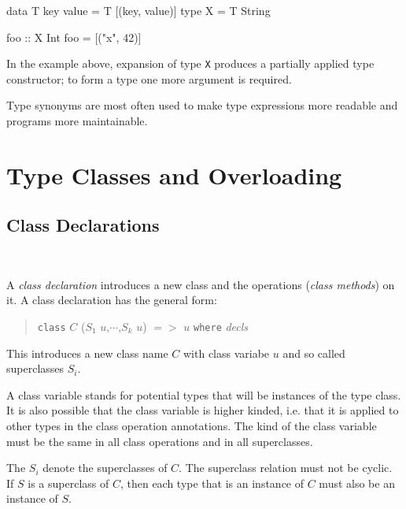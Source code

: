 \begin{code}
data T key value = T [(key, value)]
type X = T String

foo :: X Int
foo = [("x", 42)]
\end{code}

In the example above, expansion of type \texttt{X} produces a partially applied type constructor; to form a type one more argument is required.

Type synonyms are most often used to make type expressions more readable and programs more maintainable.

\section{Type Classes and Overloading}
\subsection{Class Declarations} \label{classdcl}  

\begin{flushleft}
     \\
  
\end{flushleft}

A \emph{class declaration} introduces a new class and the operations (\emph{class methods}) on it. A class declaration has the general form:

\begin{quote}
\texttt{class} $C$ \hspace{0.2cm} ($S_1$ $u$,$\cdots$,$S_k$ $u$)  $=>$ $u$\hspace{0.2cm} \texttt{where} \hspace{0.2cm} \emph{decls}
\end{quote}

This introduces a new class name $C$ with class variabe $u$ and so called superclasses $S_i$.

A class variable stands for potential types that will be instances of the type class. It is also possible that the class variable is higher kinded, i.e. that it is applied to other types in the class operation annotations. The kind of the class variable must be the same in all class operations and in all superclasses.

The $S_i$ denote the superclasses of $C$.
The superclass relation must not be cyclic. If $S$ is a superclass of $C$, then each type that is an instance of $C$ must also be an instance of $S$.


